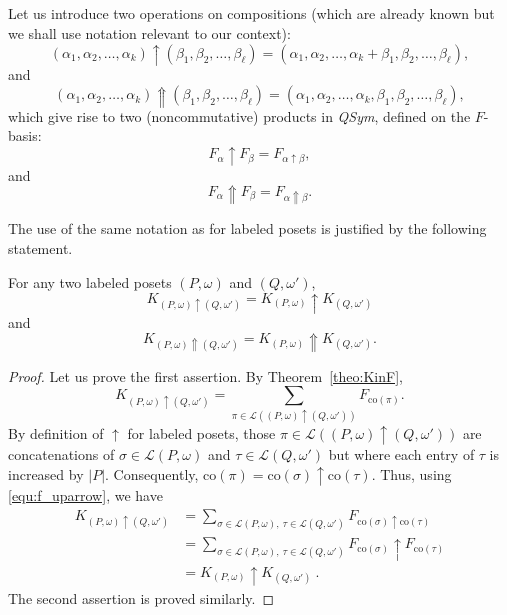 \documentclass[ALCO,Unicode,published]{cedram}
\newcommand{\qsym}{{\it{QSym}}}
\newcommand{\om}{\omega}
\newcommand{\kpw}{K_{(P,\om)}}
\renewcommand{\L}{\mathcal{L}}
\newcommand{\co}{\mathrm{co}}
\newcommand{\wP}{\uparrow}
\newcommand{\sP}{\Uparrow}
\begin{document}
Let us introduce two operations on compositions 
(which are already known but we shall use notation relevant to our context):
\begin{equation}\label{equ:uparrow}
(\alpha_1,\alpha_2,\dots,\alpha_k) \wP (\beta_1,\beta_2,\dots,\beta_\ell)
=
(\alpha_1,\alpha_2,\dots,\alpha_k+\beta_1,\beta_2,\dots,\beta_\ell),
\end{equation}
and
\begin{equation}\label{equ:upuparrow}
(\alpha_1,\alpha_2,\dots,\alpha_k) \sP (\beta_1,\beta_2,\dots,\beta_\ell)
=
(\alpha_1,\alpha_2,\dots,\alpha_k,\beta_1,\beta_2,\dots,\beta_\ell),
\end{equation}
which give rise to two (noncommutative) products in \qsym, defined on the $F$-basis:
\begin{equation}\label{equ:f_uparrow}
F_{\alpha} \wP F_{\beta}
=
F_{\alpha \wP \beta},
\end{equation}
and
\begin{equation}\label{equ:f_upuparrow}
F_{\alpha} \sP F_{\beta}
=
F_{\alpha \sP \beta}.
\end{equation}

The use of the same notation as for labeled posets is justified by the following statement.
\begin{proposition}\label{prop:k_products}
For any two labeled posets $(P,\om)$ and $(Q,\om')$, 
$$K_{(P,\om)\wP(Q,\om')}=\kpw \wP K_{(Q,\om')}$$
and
$$K_{(P,\om)\sP(Q,\om')}=\kpw \sP K_{(Q,\om')}.$$
\end{proposition}
\begin{proof}
Let us prove the first assertion.
By Theorem~\ref{theo:KinF}, 
\[
K_{(P,\om) \wP (Q,\om')} = \sum_{\pi\in\L((P,\om)\wP (Q,\om'))} F_{\co(\pi)}.
\]
By definition of $\wP$ for labeled posets, those $\pi\in\L((P,\om)\wP (Q,\om'))$ are concatenations of $\sigma\in\L(P,\om)$ and $\tau\in\L(Q,\om')$ but where each entry of $\tau$ is increased by $|P|$.   Consequently, $\co(\pi) = \co(\sigma)\wP \co(\tau)$. Thus, using \eqref{equ:f_uparrow}, we have 
\begin{align*}
K_{(P,\om) \wP (Q,\om')} 
&= \sum_{\sigma\in\L(P,\om),\:\tau\in\L(Q,\om')} F_{\co(\sigma)\wP \co(\tau)}\\
&= \sum_{\sigma\in\L(P,\om),\:\tau\in\L(Q,\om')} F_{\co(\sigma)}\wP F_{\co(\tau)}\\
&= \kpw \wP K_{(Q,\om')}\ .
\end{align*}
The second assertion is proved similarly.
\end{proof}
\end{document}
